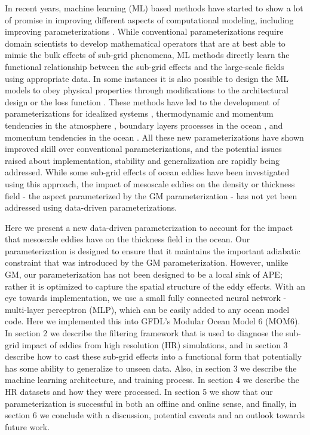 \documentclass[draft]{agujournal2019}
\begin{document}
In recent years, machine learning (ML) based methods have started to show a lot of promise in improving different aspects of computational modeling, including improving parameterizations \cite{bracco2025machine, lai2024machine}. While conventional parameterizations require domain scientists to develop mathematical operators that are at best able to mimic the bulk effects of sub-grid phenomena, ML methods directly learn the functional relationship between the sub-grid effects and the large-scale fields using appropriate data. In some instances it is also possible to design the ML models to obey physical properties through modifications to the architectural design or the loss function \cite{beucler2021enforcing, zanna2020data}. These methods have led to the development of parameterizations for idealized systems \cite{ross2023benchmarking, srinivasan2023turbulence}, thermodynamic and momentum tendencies in the atmosphere \cite{brenowitz2018prognostic, yuval2021use}, boundary layers processes in the ocean \cite{sane2023parameterizing, ramadhan2020capturing, bodner2023data}, and momentum tendencies in the ocean \cite{zhang2023implementation, zanna2020data, perezhogin2024stable}. All these new parameterizations have shown improved skill over conventional parameterizations, and the potential issues raised about implementation, stability and generalization are rapidly being addressed.  
While some sub-grid effects of ocean eddies have been investigated using this approach, the impact of mesoscale eddies on the density or thickness field - the aspect parameterized by the GM parameterization - has not yet been addressed using data-driven parameterizations. 

Here we present a new data-driven parameterization to account for the impact that mesoscale eddies have on the thickness field in the ocean. Our parameterization is designed to ensure that it maintains the important adiabatic constraint that was introduced by the GM parameterization. However, unlike GM, our parameterization has not been designed to be a local sink of APE; rather it is optimized to capture the spatial structure of the eddy effects. With an eye towards implementation, we use a small fully connected neural network - multi-layer perceptron (MLP), which can be easily added to any ocean model code. Here we implemented this into GFDL's Modular Ocean Model 6 (MOM6).
In section 2 we describe the filtering framework that is used to diagnose the sub-grid impact of eddies from high resolution (HR) simulations, and in section 3 describe how to cast these sub-grid effects into a functional form that potentially has some ability to generalize to unseen data. Also, in section 3 we describe the machine learning architecture, and training process. 
In section 4 we describe the HR datasets and how they were processed. In section 5 we show that our parameterization is successful in both an offline and online sense, and finally, in section 6 we conclude with a discussion, potential caveats and an outlook towards future work. 
\end{document}
